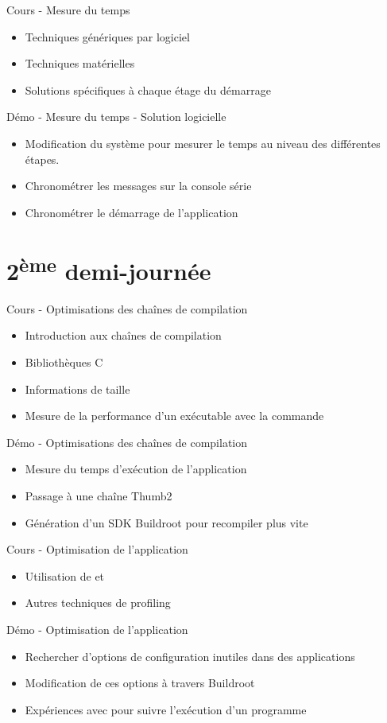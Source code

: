 \documentclass[a4paper,12pt,obeyspaces,spaces,hyphens]{article}
\begin{document}
\feagendatwocolumn
{Cours - Mesure du temps}
{
  \begin{itemize}
  \item Techniques génériques par logiciel
  \item Techniques matérielles
  \item Solutions spécifiques à chaque étage du démarrage
  \end{itemize}
}
{Démo - Mesure du temps - Solution logicielle}
{
 \begin{itemize}
 \item Modification du système pour mesurer le temps au niveau des différentes étapes.
 \item Chronométrer les messages sur la console série
 \item Chronométrer le démarrage de l'application
 \end{itemize}
}

\section{2\textsuperscript{ème} demi-journée}

\feagendaonecolumn
{Cours - Optimisations des chaînes de compilation}
{
  \begin{itemize}
  \item Introduction aux chaînes de compilation
  \item Bibliothèques C
  \item Informations de taille
  \item Mesure de la performance d'un exécutable avec la commande 
  \end{itemize}
}

\feagendaonecolumn
{Démo - Optimisations des chaînes de compilation}
{
  \begin{itemize}
  \item Mesure du temps d'exécution de l'application
  \item Passage à une chaîne Thumb2
  \item Génération d'un SDK Buildroot pour recompiler plus vite
  \end{itemize}
}

\feagendatwocolumn
{Cours - Optimisation de l'application}
{
  \begin{itemize}
  \item Utilisation de  et 
  \item Autres techniques de profiling
  \end{itemize}
}
{Démo - Optimisation de l'application}
{
 \begin{itemize}
 \item Rechercher d'options de configuration inutiles dans des applications
 \item Modification de ces options à travers Buildroot
 \item Expériences avec  pour suivre l'exécution d'un programme
 \end{itemize}
}
\end{document}
